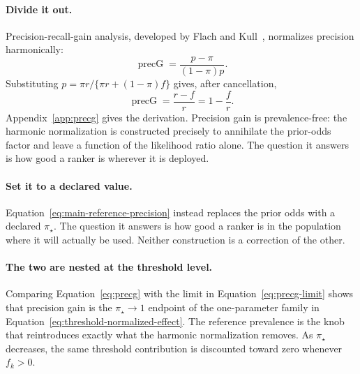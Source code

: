 \documentclass[11pt]{article}
\theoremstyle{remark}
\begin{document}
\paragraph{Divide it out.}
Precision-recall-gain analysis, developed by Flach and Kull~\cite{flach2015prg}, normalizes precision harmonically:
\[
\operatorname{precG}
=
\frac{p-\pi}{(1-\pi)p}.
\]
Substituting $p=\pi r/\{\pi r+(1-\pi)f\}$ gives, after cancellation,
\begin{equation}
\operatorname{precG}
=
\frac{r-f}{r}
=
1-\frac{f}{r}.
\label{eq:precg}
\end{equation}
Appendix~\ref{app:precg} gives the derivation. Precision gain is prevalence-free: the harmonic normalization is constructed precisely to annihilate the prior-odds factor and leave a function of the likelihood ratio alone. The question it answers is how good a ranker is wherever it is deployed.

\paragraph{Set it to a declared value.}
Equation~\eqref{eq:main-reference-precision} instead replaces the prior odds with a declared $\pi_\star$. The question it answers is how good a ranker is in the population where it will actually be used. Neither construction is a correction of the other.

\paragraph{The two are nested at the threshold level.}
Comparing Equation~\eqref{eq:precg} with the limit in Equation~\eqref{eq:precg-limit} shows that precision gain is the $\pi_\star\to1$ endpoint of the one-parameter family in Equation~\eqref{eq:threshold-normalized-effect}. The reference prevalence is the knob that reintroduces exactly what the harmonic normalization removes. As $\pi_\star$ decreases, the same threshold contribution is discounted toward zero whenever $f_k>0$.
\end{document}
